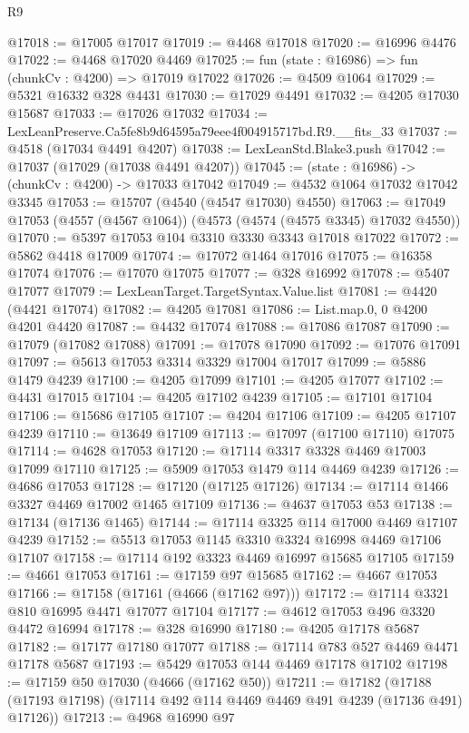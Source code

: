 \begin{lexlean}{R9}
\begin{coremodule}
@17018 := @17005 @17017
@17019 := @4468 @17018
@17020 := @16996 @4476
@17022 := @4468 @17020 @4469
@17025 := fun (state : @16986) => fun (chunkCv : @4200) => @17019 @17022
@17026 := @4509 @1064
@17029 := @5321 @16332 @328 @4431
@17030 := @17029 @4491
@17032 := @4205 @17030 @15687
@17033 := @17026 @17032
@17034 := LexLeanPreserve.Ca5fe8b9d64595a79eee4f004915717bd.R9.__fits_33
@17037 := @4518 (@17034 @4491 @4207)
@17038 := LexLeanStd.Blake3.push
@17042 := @17037 (@17029 (@17038 @4491 @4207))
@17045 := (state : @16986) -> (chunkCv : @4200) -> @17033 @17042
@17049 := @4532 @1064 @17032 @17042 @3345
@17053 := @15707 (@4540 (@4547 @17030) @4550)
@17063 := @17049 @17053 (@4557 (@4567 @1064)) (@4573 (@4574 (@4575 @3345) @17032 @4550))
@17070 := @5397 @17053 @104 @3310 @3330 @3343 @17018 @17022
@17072 := @5862 @4418 @17009
@17074 := @17072 @1464 @17016
@17075 := @16358 @17074
@17076 := @17070 @17075
@17077 := @328 @16992
@17078 := @5407 @17077
@17079 := LexLeanTarget.TargetSyntax.Value.list
@17081 := @4420 (@4421 @17074)
@17082 := @4205 @17081
@17086 := List.map.{0, 0} @4200 @4201 @4420
@17087 := @4432 @17074
@17088 := @17086 @17087
@17090 := @17079 (@17082 @17088)
@17091 := @17078 @17090
@17092 := @17076 @17091
@17097 := @5613 @17053 @3314 @3329 @17004 @17017
@17099 := @5886 @1479 @4239
@17100 := @4205 @17099
@17101 := @4205 @17077
@17102 := @4431 @17015
@17104 := @4205 @17102 @4239
@17105 := @17101 @17104
@17106 := @15686 @17105
@17107 := @4204 @17106
@17109 := @4205 @17107 @4239
@17110 := @13649 @17109
@17113 := @17097 (@17100 @17110) @17075
@17114 := @4628 @17053
@17120 := @17114 @3317 @3328 @4469 @17003 @17099 @17110
@17125 := @5909 @17053 @1479 @114 @4469 @4239
@17126 := @4686 @17053
@17128 := @17120 (@17125 @17126)
@17134 := @17114 @1466 @3327 @4469 @17002 @1465 @17109
@17136 := @4637 @17053 @53
@17138 := @17134 (@17136 @1465)
@17144 := @17114 @3325 @114 @17000 @4469 @17107 @4239
@17152 := @5513 @17053 @1145 @3310 @3324 @16998 @4469 @17106 @17107
@17158 := @17114 @192 @3323 @4469 @16997 @15685 @17105
@17159 := @4661 @17053
@17161 := @17159 @97 @15685
@17162 := @4667 @17053
@17166 := @17158 (@17161 (@4666 (@17162 @97)))
@17172 := @17114 @3321 @810 @16995 @4471 @17077 @17104
@17177 := @4612 @17053 @496 @3320 @4472 @16994
@17178 := @328 @16990
@17180 := @4205 @17178 @5687
@17182 := @17177 @17180 @17077
@17188 := @17114 @783 @527 @4469 @4471 @17178 @5687
@17193 := @5429 @17053 @144 @4469 @17178 @17102
@17198 := @17159 @50 @17030 (@4666 (@17162 @50))
@17211 := @17182
    (@17188 (@17193 @17198) (@17114 @492 @114 @4469 @4469 @491 @4239 (@17136 @491) @17126))
@17213 := @4968 @16990 @97

\end{coremodule}
\end{lexlean}
